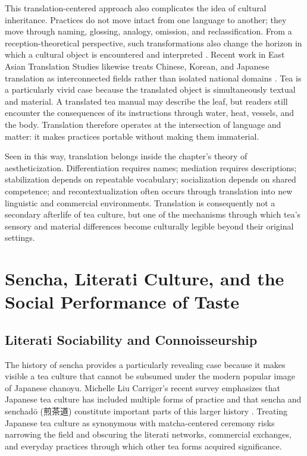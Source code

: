 \documentclass[numbers]{IntechOpen-Book}
\newcommand{\zh}[1]{{\CJKfontspec{Noto Serif CJK SC}\upshape #1}}
\begin{document}
This translation-centered approach also complicates the idea of cultural inheritance. Practices do not move intact from one language to another; they move through naming, glossing, analogy, omission, and reclassification. From a reception-theoretical perspective, such transformations also change the horizon in which a cultural object is encountered and interpreted \cite{jauss}. Recent work in East Asian Translation Studies likewise treats Chinese, Korean, and Japanese translation as interconnected fields rather than isolated national domains \cite{xu}. Tea is a particularly vivid case because the translated object is simultaneously textual and material. A translated tea manual may describe the leaf, but readers still encounter the consequences of its instructions through water, heat, vessels, and the body. Translation therefore operates at the intersection of language and matter: it makes practices portable without making them immaterial.

Seen in this way, translation belongs inside the chapter's theory of aestheticization. Differentiation requires names; mediation requires descriptions; stabilization depends on repeatable vocabulary; socialization depends on shared competence; and recontextualization often occurs through translation into new linguistic and commercial environments. Translation is consequently not a secondary afterlife of tea culture, but one of the mechanisms through which tea's sensory and material differences become culturally legible beyond their original settings.

\section{Sencha, Literati Culture, and the Social Performance of Taste}

\subsection{Literati Sociability and Connoisseurship}

The history of sencha provides a particularly revealing case because it makes visible a tea culture that cannot be subsumed under the modern popular image of Japanese chanoyu. Michelle Liu Carriger's recent survey emphasizes that Japanese tea culture has included multiple forms of practice and that sencha and senchad\=o (\zh{煎茶道}) constitute important parts of this larger history \cite{carriger}. Treating Japanese tea culture as synonymous with matcha-centered ceremony risks narrowing the field and obscuring the literati networks, commercial exchanges, and everyday practices through which other tea forms acquired significance.
\end{document}
